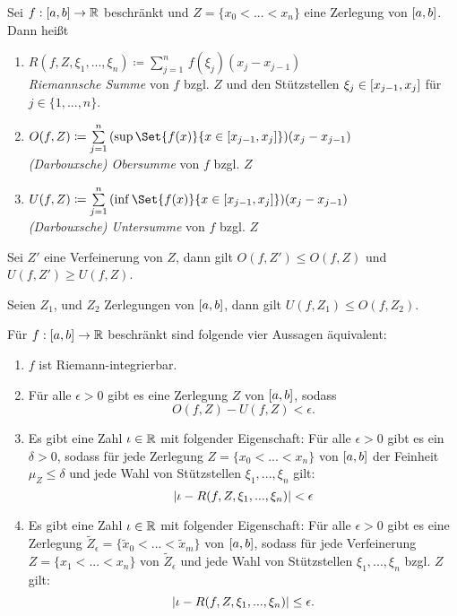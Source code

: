 \documentclass{cheat-sheet}
\begin{document}
\begin{defn}
  Sei $f : \left[ a, b \right] \to \mathbb{R}$ beschränkt und $Z = \{ x_0 < ... < x_n \}$ eine Zerlegung von $\left[ a, b \right]$. Dann heißt
  \begin{enumerate}
    \item
      $R(f, Z, \xi_1, ..., \xi_n) \coloneqq \sum_{j=1}^{n}\,f(\xi_j)(x_j - x_{j-1})$\\
      \emph{Riemannsche Summe} von $f$ bzgl. $Z$ und den Stützstellen $\xi_j \in \left[ x_{j-1}, x_j \right]$ für $j \in \{ 1, ..., n \}$.
    \item
      $O(f, Z) \coloneqq \sum_{j=1}^{n}\,(\sup\Set{f(x)}{x \in \cinterval{x_{j-1}}{x_j}})(x_j - x_{j-1})$\\
      \emph{(Darbouxsche) Obersumme} von $f$ bzgl. $Z$
    \item
      $U(f, Z) \coloneqq \sum_{j=1}^{n}\,(\inf\Set{f(x)}{x \in \cinterval{x_{j-1}}{x_j}})(x_j - x_{j-1})$\\
      \emph{(Darbouxsche) Untersumme} von $f$ bzgl. $Z$
  \end{enumerate}
\end{defn}

\begin{bem}
  Sei $Z'$ eine Verfeinerung von $Z$, dann gilt $O(f, Z') \le O(f, Z)$ und $U(f, Z') \ge U(f, Z)$.
\end{bem}

\begin{satz}
  Seien $Z_1$, und $Z_2$ Zerlegungen von $\left[ a, b \right]$, dann gilt $U(f, Z_1) \le O(f, Z_2)$.
\end{satz}

\begin{satz}
  Für $f : \left[ a, b \right] \to \mathbb{R}$ beschränkt sind folgende vier Aussagen äquivalent:

  \begin{enumerate}
    \item $f$ ist Riemann-integrierbar.
    \item Für alle $\epsilon > 0$ gibt es eine Zerlegung $Z$ von $\left[ a, b \right]$, sodass
      \[ O(f, Z) - U(f, Z) < \epsilon. \]
    \item Es gibt eine Zahl $\iota \in \mathbb{R}$ mit folgender Eigenschaft: Für alle $\epsilon > 0$ gibt es ein $\delta > 0$, sodass für jede Zerlegung $Z = \{ x_0 < ... < x_n \}$ von $\left[ a, b \right]$ der Feinheit $\mu_Z \le \delta$ und jede Wahl von Stützstellen $\xi_1, ..., \xi_n$ gilt:
    \[ \lvert\iota - R(f, Z, \xi_1, ..., \xi_n)\rvert < \epsilon \]
    \item Es gibt eine Zahl $\iota \in \mathbb{R}$ mit folgender Eigenschaft: Für alle $\epsilon > 0$ gibt es eine Zerlegung $\widetilde{Z}_{\epsilon} = \{ \widetilde{x}_0 < ... < \widetilde{x}_m \}$ von $\left[ a, b \right]$, sodass für jede Verfeinerung $Z = \{ x_1 < ... < x_n \}$ von $\widetilde{Z}_{\epsilon}$ und jede Wahl von Stützstellen $\xi_1, ..., \xi_n$ bzgl. $Z$ gilt:
    \[ \lvert\iota - R(f, Z, \xi_1, ..., \xi_n)\rvert \le \epsilon. \]
  \end{enumerate}
\end{satz}
\end{document}
